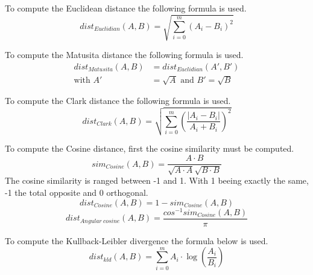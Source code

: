 \begin{definition}
  To compute the Euclidean distance the following formula is used.
  \begin{equation}
    dist_{Euclidian}(A, B) = \sqrt{\sum_{i=0}^{m}(A_i - B_i)^2}
  \end{equation}
\end{definition}

\begin{definition}
  To compute the Matusita distance the following formula is used.
  \begin{equation}
    \begin{split}
      dist_{Matusita}(A, B) &= dist_{Euclidian}(A', B') \\
      \text{with }A' &= \sqrt{A}\text{ and }B' = \sqrt{B}
    \end{split}
  \end{equation}
\end{definition}

\begin{definition}
  To compute the Clark distance the following formula is used.
  \begin{equation}
    dist_{Clark}(A, B) = \sqrt{\sum_{i=0}^{m}\left(\frac{|A_i - B_i|}{A_i + B_i}\right)^2}
  \end{equation}
\end{definition}

\begin{definition}
  \label{def:cosine_dist}
  To compute the Cosine distance, first the cosine similarity must be computed.
  \begin{equation}
    sim_{Cosine}(A, B) = \frac{A \cdot B}{\sqrt{A \cdot A}\sqrt{B \cdot B}}
  \end{equation}
  The cosine similarity is ranged between -1 and 1.
  With 1 beeing exactly the same, -1 the total opposite and 0 orthogonal.
  \begin{equation}
    dist_{Cosine}(A, B) = 1 - sim_{Cosine}(A, B)
  \end{equation}
  \begin{equation}
    dist_{Angular\ cosine}(A, B) = \frac{cos^{-1}sim_{Cosine}(A, B)}{\pi}
  \end{equation}
\end{definition}

\begin{definition}
  To compute the Kullback-Leibler divergence the formula below is used.
  \begin{equation}
    dist_{kld}(A, B) = \sum_{i=0}^{m} A_i \cdot \log(\frac{A_i}{B_i})
  \end{equation}
\end{definition}


